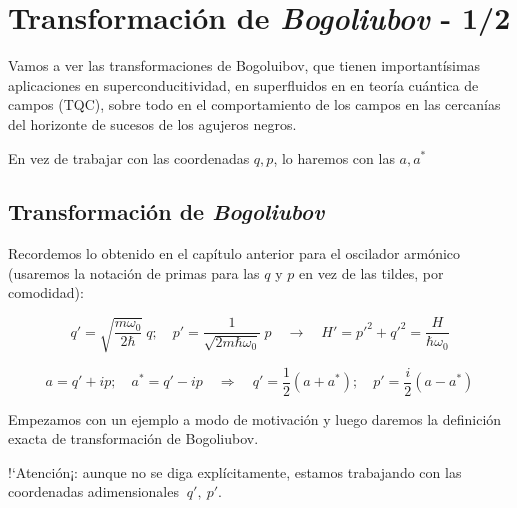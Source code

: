 \chapter{Transformación de \emph{Bogoliubov} - 1/2}




\vspace{10mm}
\begin{adjustwidth}{50pt}{50pt}
\begin{ejemplo}

Vamos a ver las transformaciones de Bogoluibov, que tienen importantísimas aplicaciones en superconducitividad, en superfluidos en en teoría cuántica de campos (TQC), sobre todo en el comportamiento de los campos en las cercanías del horizonte de sucesos de los agujeros negros.

En vez de trabajar con las coordenadas $q,p$, lo haremos con las $a,a^*$

\end{ejemplo}
\end{adjustwidth}
\vspace{5mm}
\section{Transformación de \emph{Bogoliubov}}

\begin{definition}

Recordemos lo obtenido en el capítulo anterior para el oscilador armónico \textcolor{gris}{(usaremos la notación de primas para las $q$ y $p$ en vez de las tildes, por comodidad)}:

 $$q'=\sqrt{\frac{m\omega_0}{2\hbar}}\ q;\quad p'=\dfrac 1{\sqrt{2m\hbar \omega_0}}\ p \quad \to \quad H'=p'^2+q'^2=\dfrac{H}{\hbar \omega_0}$$
 
 $$a=q'+ip; \quad a^* =q'-ip \quad \Rightarrow \quad q'=\dfrac 1 2 (a+a^*);\quad p'=\dfrac i 2 (a-a^*)$$
\end{definition}

Empezamos con un ejemplo a modo de motivación y luego daremos la definición exacta de transformación de Bogoliubov.

!`Atención¡: aunque no se diga explícitamente, estamos trabajando con las coordenadas adimensionales $\ q',\ p'$.

